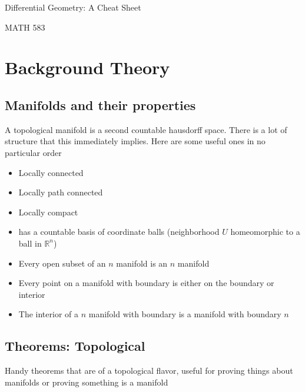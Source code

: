 \documentclass[11pt]{book}
\begin{document}
 
	
	\vspace*{20mm}
	
	\begin{center}
		\Huge{Differential Geometry: A Cheat Sheet}\\
		
		\vspace{10mm}
		
		\Huge{MATH 583}\\
		
	\end{center}
	
	
	\newpage 
	
	\tableofcontents
	
	\newpage
	
	\chapter{Background Theory}
	\section{Manifolds and their properties}
	
	A topological manifold is a second countable hausdorff space. There is a lot of structure that this immediately implies. Here are some useful ones in no particular order
	
	\begin{itemize}
		\item Locally connected
		\item Locally path connected
		\item Locally compact
		\item has a countable basis of coordinate balls (neighborhood $U$ homeomorphic to a ball in $\mathbb{R}^n$)
		\item Every open subset of an $n$ manifold is an $n$ manifold
		\item Every point on a manifold with boundary is either on the boundary or interior
		\item The interior of a $n$ manifold with boundary is a manifold with boundary $n$  
	\end{itemize}
	
	
	\section{Theorems: Topological}
	
	Handy theorems that are of a topological flavor, useful for proving things about manifolds or proving something is a manifold
	
\end{document}
